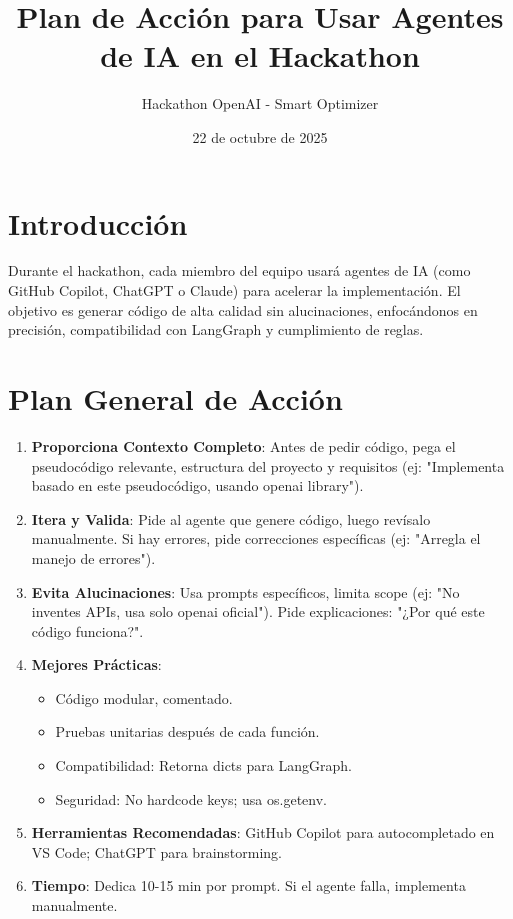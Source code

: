 \documentclass{article}
\title{Plan de Acción para Usar Agentes de IA en el Hackathon}
\author{Hackathon OpenAI - Smart Optimizer}
\date{22 de octubre de 2025}
\begin{document}
\maketitle

\section{Introducción}

Durante el hackathon, cada miembro del equipo usará agentes de IA (como GitHub Copilot, ChatGPT o Claude) para acelerar la implementación. El objetivo es generar código de alta calidad sin alucinaciones, enfocándonos en precisión, compatibilidad con LangGraph y cumplimiento de reglas.

\section{Plan General de Acción}

\begin{enumerate}
    \item \textbf{Proporciona Contexto Completo}: Antes de pedir código, pega el pseudocódigo relevante, estructura del proyecto y requisitos (ej: "Implementa basado en este pseudocódigo, usando openai library").
    
    \item \textbf{Itera y Valida}: Pide al agente que genere código, luego revísalo manualmente. Si hay errores, pide correcciones específicas (ej: "Arregla el manejo de errores").
    
    \item \textbf{Evita Alucinaciones}: Usa prompts específicos, limita scope (ej: "No inventes APIs, usa solo openai oficial"). Pide explicaciones: "¿Por qué este código funciona?".
    
    \item \textbf{Mejores Prácticas}:
    \begin{itemize}
        \item Código modular, comentado.
        \item Pruebas unitarias después de cada función.
        \item Compatibilidad: Retorna dicts para LangGraph.
        \item Seguridad: No hardcode keys; usa os.getenv.
    \end{itemize}
    
    \item \textbf{Herramientas Recomendadas}: GitHub Copilot para autocompletado en VS Code; ChatGPT para brainstorming.
    
    \item \textbf{Tiempo}: Dedica 10-15 min por prompt. Si el agente falla, implementa manualmente.
\end{enumerate}
\end{document}
